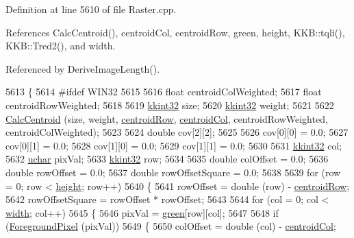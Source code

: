 Definition at line 5610 of file Raster.\+cpp.



References Calc\+Centroid(), centroid\+Col, centroid\+Row, green, height, K\+K\+B\+::tqli(), K\+K\+B\+::\+Tred2(), and width.



Referenced by Derive\+Image\+Length().


\begin{DoxyCode}
5613 \{
5614 \textcolor{preprocessor}{#ifdef  WIN32}
5615 
5616   \textcolor{keywordtype}{float}  centroidColWeighted;
5617   \textcolor{keywordtype}{float}  centroidRowWeighted;
5618 
5619   \hyperlink{namespace_k_k_b_a8fa4952cc84fda1de4bec1fbdd8d5b1b}{kkint32}  size;
5620   \hyperlink{namespace_k_k_b_a8fa4952cc84fda1de4bec1fbdd8d5b1b}{kkint32}  weight;
5621 
5622   \hyperlink{class_k_k_b_1_1_raster_a89e2ed864ff7030d55bf4c655de15636}{CalcCentroid} (size, weight, \hyperlink{class_k_k_b_1_1_raster_a3380e5734ec57a147e36c734cc83c5ff}{centroidRow}, \hyperlink{class_k_k_b_1_1_raster_ac4cb3984d20f6eef6fd4f201681ea1d5}{centroidCol}, 
      centroidRowWeighted, centroidColWeighted);
5623 
5624   \textcolor{keywordtype}{double}  cov[2][2];
5625 
5626   cov[0][0] = 0.0;
5627   cov[0][1] = 0.0;
5628   cov[1][0] = 0.0;
5629   cov[1][1] = 0.0;
5630 
5631   \hyperlink{namespace_k_k_b_a8fa4952cc84fda1de4bec1fbdd8d5b1b}{kkint32}  col;
5632   \hyperlink{namespace_k_k_b_ace9969169bf514f9ee6185186949cdf7}{uchar}  pixVal;
5633   \hyperlink{namespace_k_k_b_a8fa4952cc84fda1de4bec1fbdd8d5b1b}{kkint32}  row;
5634 
5635   \textcolor{keywordtype}{double}  colOffset = 0.0;
5636   \textcolor{keywordtype}{double}  rowOffset = 0.0;
5637   \textcolor{keywordtype}{double}  rowOffsetSquare = 0.0;
5638 
5639   \textcolor{keywordflow}{for}  (row = 0; row < \hyperlink{class_k_k_b_1_1_raster_af39ff189de4fbb6de98392e187efafb7}{height};  row++)
5640   \{
5641     rowOffset = double (row) - \hyperlink{class_k_k_b_1_1_raster_a3380e5734ec57a147e36c734cc83c5ff}{centroidRow};
5642     rowOffsetSquare = rowOffset * rowOffset;
5643 
5644     \textcolor{keywordflow}{for}  (col = 0; col < \hyperlink{class_k_k_b_1_1_raster_ae0bcc103e191c3421d7692dc69ceb554}{width}; col++)
5645     \{
5646       pixVal = \hyperlink{class_k_k_b_1_1_raster_a2d2238911145488e226cd2e34fc8448c}{green}[row][col];
5647 
5648       \textcolor{keywordflow}{if}  (\hyperlink{class_k_k_b_1_1_raster_aa1e1363589e719eb64f0957281b84b6a}{ForegroundPixel} (pixVal))
5649       \{
5650         colOffset = double (col) - \hyperlink{class_k_k_b_1_1_raster_ac4cb3984d20f6eef6fd4f201681ea1d5}{centroidCol};

\end{DoxyCode}
